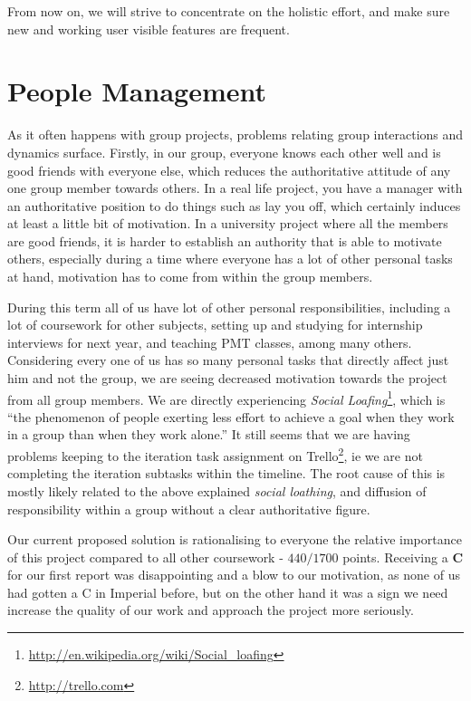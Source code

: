 \documentclass[a4paper,12pt]{article}
\begin{document}
	From now on, we will strive to concentrate on the holistic effort, and make sure new and working user visible features are frequent.
	
	
	\section{People Management}
	
	As it often happens with group projects, problems relating group interactions and dynamics surface. Firstly, in our group, everyone knows each other well and is good friends with everyone else, which reduces the authoritative attitude of any one group member towards others. In a real life project, you have a manager with an authoritative position to do things such as lay you off, which certainly induces at least a little bit of motivation. In a university project where all the members are good friends, it is harder to establish an authority that is able to motivate others, especially during a time where everyone has a lot of other personal tasks at hand, motivation has to come from within the group members.
	
	During this term all of us have lot of other personal responsibilities, including a lot of coursework for other subjects, setting up and studying for internship interviews for next year, and teaching PMT classes, among many others. Considering every one of us has so many personal tasks that directly affect just him and not the group, we are seeing decreased motivation towards the project from all group members. We are directly experiencing \emph{Social Loafing}\footnote{\url{http://en.wikipedia.org/wiki/Social_loafing}}, which is ``the phenomenon of people exerting less effort to achieve a goal when they work in a group than when they work alone.'' It still seems that we are having problems keeping to the iteration task assignment on Trello\footnote{\url{http://trello.com}}, ie we are not completing the iteration subtasks within the timeline. The root cause of this is mostly likely related to the above explained \emph{social loathing}, and diffusion of responsibility within a group without a clear authoritative figure.
	
	Our current proposed solution is rationalising to everyone the relative importance of this project compared to all other coursework - $440/1700$ points. Receiving a \textbf{C} for our first report was disappointing and a blow to our motivation, as none of us had gotten a C in Imperial before, but on the other hand it was a sign we need increase the quality of our work and approach the project more seriously.
	
\end{document}
